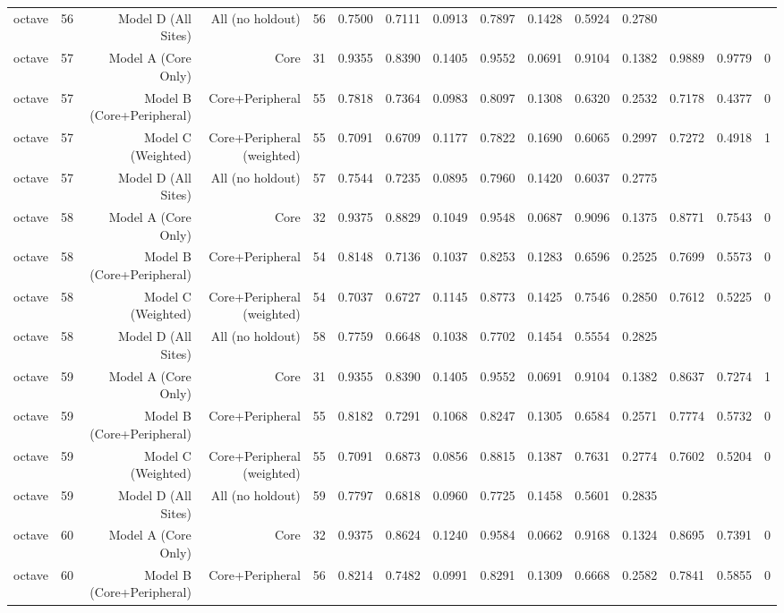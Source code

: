 {\begin{longtable}{lrrrrrrrrrrrrrr}
  octave & 56 & Model D (All Sites) & All (no holdout) & 56 & 0.7500 & 0.7111 & 0.0913 & 0.7897 & 0.1428 & 0.5924 & 0.2780 &  &  &  \\
  octave & 57 & Model A (Core Only) & Core & 31 & 0.9355 & 0.8390 & 0.1405 & 0.9552 & 0.0691 & 0.9104 & 0.1382 & 0.9889 & 0.9779 & 0 \\
  octave & 57 & Model B (Core+Peripheral) & Core+Peripheral & 55 & 0.7818 & 0.7364 & 0.0983 & 0.8097 & 0.1308 & 0.6320 & 0.2532 & 0.7178 & 0.4377 & 0 \\
  octave & 57 & Model C (Weighted) & Core+Peripheral (weighted) & 55 & 0.7091 & 0.6709 & 0.1177 & 0.7822 & 0.1690 & 0.6065 & 0.2997 & 0.7272 & 0.4918 & 1 \\
  octave & 57 & Model D (All Sites) & All (no holdout) & 57 & 0.7544 & 0.7235 & 0.0895 & 0.7960 & 0.1420 & 0.6037 & 0.2775 &  &  &  \\
  octave & 58 & Model A (Core Only) & Core & 32 & 0.9375 & 0.8829 & 0.1049 & 0.9548 & 0.0687 & 0.9096 & 0.1375 & 0.8771 & 0.7543 & 0 \\
  octave & 58 & Model B (Core+Peripheral) & Core+Peripheral & 54 & 0.8148 & 0.7136 & 0.1037 & 0.8253 & 0.1283 & 0.6596 & 0.2525 & 0.7699 & 0.5573 & 0 \\
  octave & 58 & Model C (Weighted) & Core+Peripheral (weighted) & 54 & 0.7037 & 0.6727 & 0.1145 & 0.8773 & 0.1425 & 0.7546 & 0.2850 & 0.7612 & 0.5225 & 0 \\
  octave & 58 & Model D (All Sites) & All (no holdout) & 58 & 0.7759 & 0.6648 & 0.1038 & 0.7702 & 0.1454 & 0.5554 & 0.2825 &  &  &  \\
  octave & 59 & Model A (Core Only) & Core & 31 & 0.9355 & 0.8390 & 0.1405 & 0.9552 & 0.0691 & 0.9104 & 0.1382 & 0.8637 & 0.7274 & 1 \\
  octave & 59 & Model B (Core+Peripheral) & Core+Peripheral & 55 & 0.8182 & 0.7291 & 0.1068 & 0.8247 & 0.1305 & 0.6584 & 0.2571 & 0.7774 & 0.5732 & 0 \\
  octave & 59 & Model C (Weighted) & Core+Peripheral (weighted) & 55 & 0.7091 & 0.6873 & 0.0856 & 0.8815 & 0.1387 & 0.7631 & 0.2774 & 0.7602 & 0.5204 & 0 \\
  octave & 59 & Model D (All Sites) & All (no holdout) & 59 & 0.7797 & 0.6818 & 0.0960 & 0.7725 & 0.1458 & 0.5601 & 0.2835 &  &  &  \\
  octave & 60 & Model A (Core Only) & Core & 32 & 0.9375 & 0.8624 & 0.1240 & 0.9584 & 0.0662 & 0.9168 & 0.1324 & 0.8695 & 0.7391 & 0 \\
  octave & 60 & Model B (Core+Peripheral) & Core+Peripheral & 56 & 0.8214 & 0.7482 & 0.0991 & 0.8291 & 0.1309 & 0.6668 & 0.2582 & 0.7841 & 0.5855 & 0 \\

\end{longtable}}
